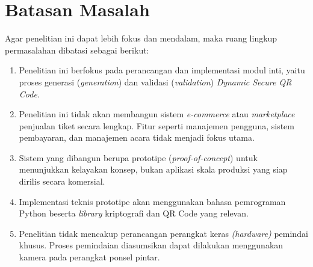 \section{Batasan Masalah}
Agar penelitian ini dapat lebih fokus dan mendalam, maka ruang lingkup permasalahan dibatasi sebagai berikut:
\begin{enumerate}
\item	Penelitian ini berfokus pada perancangan dan implementasi modul inti, yaitu proses generasi (\textit{generation}) dan validasi (\textit{validation}) \textit{Dynamic Secure QR Code}.
\item	Penelitian ini tidak akan membangun sistem \textit{e-commerce} atau \textit{marketplace} penjualan tiket secara lengkap. Fitur seperti manajemen pengguna, sistem pembayaran, dan manajemen acara tidak menjadi fokus utama.
\item	Sistem yang dibangun berupa prototipe (\textit{proof-of-concept}) untuk menunjukkan kelayakan konsep, bukan aplikasi skala produksi yang siap dirilis secara komersial.
\item   Implementasi teknis prototipe akan menggunakan bahasa pemrograman Python beserta \textit{library} kriptografi dan QR Code yang relevan.
\item   Penelitian tidak mencakup perancangan perangkat keras \textit{(hardware)} pemindai khusus. Proses pemindaian diasumsikan dapat dilakukan menggunakan kamera pada perangkat ponsel pintar.
\end{enumerate}

